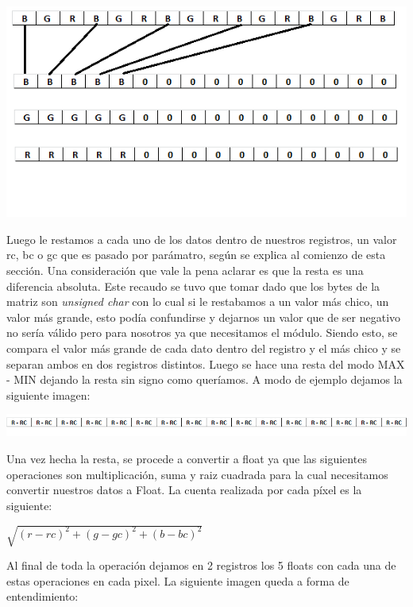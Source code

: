 \begin{center}
\includegraphics{imagenes/ImagenReorden.png}  
\end{center}

Luego le restamos a cada uno de los datos dentro de nuestros registros, un valor rc, bc o gc que es pasado por par\'amatro, seg\'un se explica al
comienzo de esta secci\'on. Una consideraci\'on que vale la pena aclarar es que la resta es una diferencia absoluta. Este recaudo se tuvo que tomar dado 
que los bytes de la matriz son \emph{unsigned char} con lo cual si le restabamos a un valor m\'as chico, un valor m\'as grande, esto pod\'ia confundirse y dejarnos
un valor que de ser negativo no ser\'ia v\'alido pero para nosotros ya que necesitamos el m\'odulo. Siendo esto, se compara el valor m\'as grande de cada dato
dentro del registro y el m\'as chico y se separan ambos en dos registros distintos. Luego se hace una resta del modo MAX - MIN dejando la resta sin signo
como quer\'iamos. A modo de ejemplo dejamos la siguiente imagen:

\begin{center}
\includegraphics[width=16cm]{imagenes/resta.png} 
\end{center}

Una vez hecha la resta, se procede a convertir a float ya que las siguientes operaciones son multiplicaci\'on, suma y raiz cuadrada para la cual necesitamos
convertir nuestros datos a Float. La cuenta realizada por cada p\'ixel es la siguiente:

\begin{center}
 $\sqrt{(r - rc)^2 + (g - gc)^2 + (b - bc)^2}$
\end{center}

Al final de toda la operaci\'on dejamos en 2 registros los 5 floats con cada una de estas operaciones en cada pixel. La siguiente imagen queda a forma de
entendimiento:

